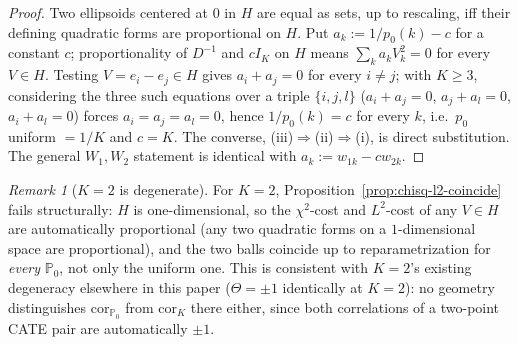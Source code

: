 \documentclass[11pt]{article}
\theoremstyle{plain}
\theoremstyle{definition}
\theoremstyle{remark}
\newtheorem{remark}[theorem]{Remark}
\newcommand{\PP}{\mathbb{P}}
\newcommand{\Corr}{\mathrm{cor}}
\begin{document}
\begin{proof}
Two ellipsoids centered at $0$ in $H$ are equal as sets, up to rescaling, iff their
defining quadratic forms are proportional on $H$. Put $a_k:=1/p_0(k)-c$ for a
constant $c$; proportionality of $D^{-1}$ and $cI_K$ on $H$ means
$\sum_ka_kV_k^2=0$ for every $V\in H$. Testing $V=e_i-e_j\in H$ gives $a_i+a_j=0$ for
every $i\ne j$; with $K\ge3$, considering the three such equations over a triple
$\{i,j,l\}$ ($a_i+a_j=0$, $a_j+a_l=0$, $a_i+a_l=0$) forces $a_i=a_j=a_l=0$, hence
$1/p_0(k)=c$ for every $k$, i.e.\ $p_0$ uniform $=1/K$ and $c=K$. The converse,
(iii)$\Rightarrow$(ii)$\Rightarrow$(i), is direct substitution. The general
$W_1,W_2$ statement is identical with $a_k:=w_{1k}-cw_{2k}$.
\end{proof}

\begin{remark}[$K=2$ is degenerate]\label{rem:k2-coincide-degenerate}
For $K=2$, Proposition~\ref{prop:chisq-l2-coincide} fails structurally: $H$ is
one-dimensional, so the $\chi^2$-cost and $L^2$-cost of any $V\in H$ are automatically
proportional (any two quadratic forms on a $1$-dimensional space are proportional),
and the two balls coincide up to reparametrization for \emph{every} $\PP_0$, not only
the uniform one. This is consistent with $K=2$'s existing degeneracy elsewhere in
this paper ($\Theta=\pm1$ identically at $K=2$): no geometry distinguishes
$\Corr_{\PP_0}$ from $\Corr_K$ there either, since both correlations of a two-point
CATE pair are automatically $\pm1$.
\end{remark}
\end{document}
